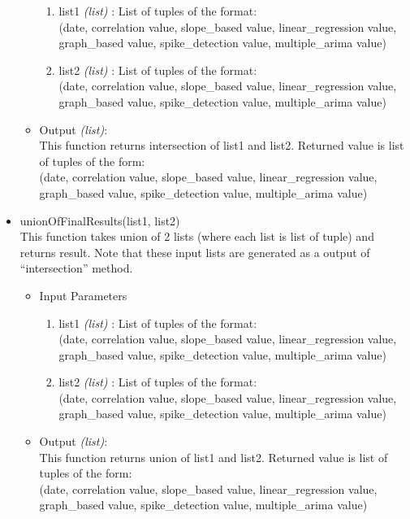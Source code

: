 \begin{itemize}
\begin{itemize}
 \begin{enumerate}
  \item list1 \textit{(list)} : List of tuples of the format: \\
  (date, correlation value, slope\_based value, linear\_regression value, 
graph\_based value, spike\_detection value, multiple\_arima value)
  \item list2 \textit{(list)} :  List of tuples of the format:  \\
  (date, correlation value, slope\_based value, linear\_regression value, 
graph\_based value, spike\_detection value, multiple\_arima value)

 \end{enumerate}

 \item Output \textit{(list)}: \\
 This function returns intersection of list1 and list2. Returned value is list 
of tuples of the form: \\
 (date, correlation value, slope\_based value, linear\_regression value, 
graph\_based value, spike\_detection value, multiple\_arima value)

 \end{itemize}
 
 
 
 \item unionOfFinalResults(list1, list2) \\
 This function takes union of 2 lists (where each list is list of tuple) and 
returns result. Note that these input lists are generated as a output of 
``intersection'' method.
 \begin{itemize}
 \item Input Parameters
 
 \begin{enumerate}
  \item list1 \textit{(list)} : List of tuples of the format: \\
  (date, correlation value, slope\_based value, linear\_regression value, 
graph\_based value, spike\_detection value, multiple\_arima value)
  \item list2 \textit{(list)} :  List of tuples of the format:  \\
  (date, correlation value, slope\_based value, linear\_regression value, 
graph\_based value, spike\_detection value, multiple\_arima value)

 \end{enumerate}

 \item Output \textit{(list)}: \\
 This function returns union of list1 and list2. Returned value is list of 
tuples of the form: \\
 (date, correlation value, slope\_based value, linear\_regression value, 
graph\_based value, spike\_detection value, multiple\_arima value)


\end{itemize}
\end{itemize}
